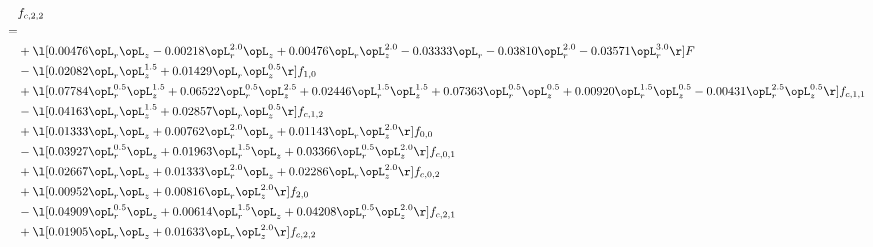 \begin{alignat}{2} 
\label{eq:f_22_1} 
& f_{c,2,2} \nonumber \\ 
 = \\ 
& + \l[  0.00476 \opL_r \opL_z   -0.00218 \opL_r^{2.0} \opL_z +  0.00476 \opL_r \opL_z^{2.0}   -0.03333 \opL_r   -0.03810 \opL_r^{2.0}   -0.03571 \opL_r^{3.0}  \r] F \nonumber \\ 
& - \l[  0.02082 \opL_r \opL_z^{1.5} +  0.01429 \opL_r \opL_z^{0.5}  \r] f_{1,0} \nonumber \\ 
& + \l[  0.07784 \opL_r^{0.5} \opL_z^{1.5} +  0.06522 \opL_r^{0.5} \opL_z^{2.5} +  0.02446 \opL_r^{1.5} \opL_z^{1.5} +  0.07363 \opL_r^{0.5} \opL_z^{0.5} +  0.00920 \opL_r^{1.5} \opL_z^{0.5}   -0.00431 \opL_r^{2.5} \opL_z^{0.5}  \r] f_{c,1,1} \nonumber \\ 
& - \l[  0.04163 \opL_r \opL_z^{1.5} +  0.02857 \opL_r \opL_z^{0.5}  \r] f_{c,1,2} \nonumber \\ 
& + \l[  0.01333 \opL_r \opL_z +  0.00762 \opL_r^{2.0} \opL_z +  0.01143 \opL_r \opL_z^{2.0}  \r] f_{0,0} \nonumber \\ 
& - \l[  0.03927 \opL_r^{0.5} \opL_z +  0.01963 \opL_r^{1.5} \opL_z +  0.03366 \opL_r^{0.5} \opL_z^{2.0}  \r] f_{c,0,1} \nonumber \\ 
& + \l[  0.02667 \opL_r \opL_z +  0.01333 \opL_r^{2.0} \opL_z +  0.02286 \opL_r \opL_z^{2.0}  \r] f_{c,0,2} \nonumber \\ 
& + \l[  0.00952 \opL_r \opL_z +  0.00816 \opL_r \opL_z^{2.0}  \r] f_{2,0} \nonumber \\ 
& - \l[  0.04909 \opL_r^{0.5} \opL_z +  0.00614 \opL_r^{1.5} \opL_z +  0.04208 \opL_r^{0.5} \opL_z^{2.0}  \r] f_{c,2,1} \nonumber \\ 
& + \l[  0.01905 \opL_r \opL_z +  0.01633 \opL_r \opL_z^{2.0}  \r] f_{c,2,2} \nonumber \\ 
\end{alignat} 


